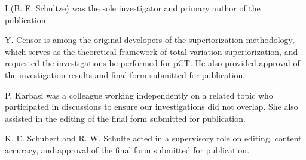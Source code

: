{\begin{attributionList}
    \begin{authorList}
        \item I (B. E. Schultze) was the sole investigator and primary author of the publication.
        \item Y. Censor is among the original developers of the superiorization methodology, which serves as the theoretical framework of total variation superiorization, and requested the investigations be performed for pCT. He also provided approval of the investigation results and final form submitted for publication.
        \item P. Karbasi was a colleague working independently on a related topic who participated in discussions to ensure our investigations did not overlap. She also assisted in the editing of the final form submitted for publication.
        \item K. E. Schubert and R. W. Schulte acted in a supervisory role on editing, content accuracy, and approval of the final form submitted for publication.%
    \end{authorList}%
\end{attributionList}
}
\endinput
